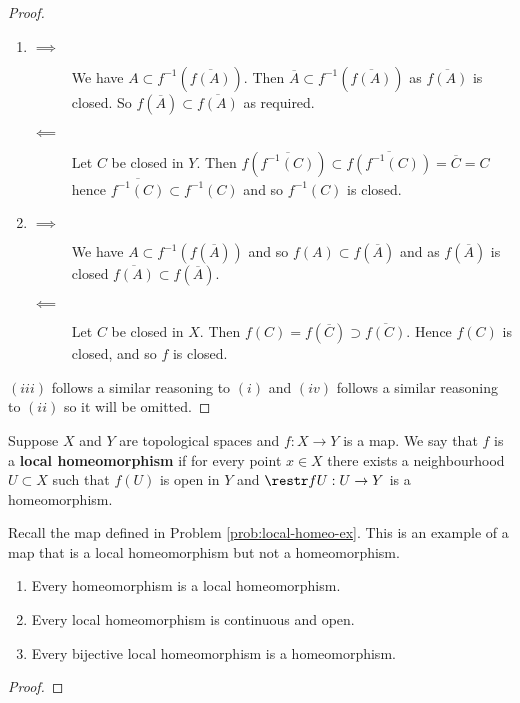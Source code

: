\begin{proof}
	\begin{enumerate}
		\item 
			\begin{description}
				\item[$\implies$]
					We have $
						A \subset f^{-1} \left( \overline{f(A)} \right)
					$. Then $
					\overline A \subset f^{-1} \left( \overline{f(A)} \right)
					$ as $\overline{f(A)}$ is closed. So $
						f(\overline A) \subset \overline{f(A)}
					$ as required.

				\item[$\impliedby$]
					Let $C$ be closed in $Y$.
					Then $
						f \left( \overline{f^{-1}(C)} \right)
						\subset \overline{f\left(f^{-1}(C)\right)}
						= \overline C
						= C
					$ hence $
						\overline{f^{-1}(C)} \subset f^{-1}(C)
					$ and so $f^{-1}(C)$ is closed.

			\end{description}
		\item
			\begin{description}
				\item[$\implies$]
					We have $
						A \subset f^{-1}(f(\overline A))
					$ and so $
						f(A) \subset f(\overline A)
					$ and as $f(\overline A)$ is closed $
						\overline{f(A)} \subset f(\overline A)
					$.

				\item[$\impliedby$]
					Let $C$ be closed in $X$.
					Then $
						f(C) = f(\overline C) \supset \overline{f(C)}
					$. Hence $f(C)$ is closed, and so $f$ is closed.
			\end{description}
	\end{enumerate}
	$(iii)$ follows a similar reasoning to $(i)$ and $(iv)$ follows a similar
	reasoning to $(ii)$ so it will be omitted.
\end{proof}

\begin{definition}
	Suppose $X$ and $Y$ are topological spaces
	and $f: X \to Y$ is a map.
	We say that $f$ is a \textbf{local homeomorphism} if
	for every point $x \in X$ there exists a neighbourhood
	$U \subset X$ such that $f(U)$ is open in $Y$
	and $\restr fU: U \to Y$ is a homeomorphism.
\end{definition}

\begin{example}[]
	Recall the map defined in Problem \ref{prob:local-homeo-ex}.
	This is an example of a map that is a local homeomorphism but not a
	homeomorphism.
\end{example}

\begin{proposition}[]
	\hfill
	\begin{enumerate}
		\item Every homeomorphism is a local homeomorphism.
		\item Every local homeomorphism is continuous and open.
		\item Every bijective local homeomorphism is a homeomorphism.
	\end{enumerate}
\end{proposition}

\begin{proof}
\end{proof}

